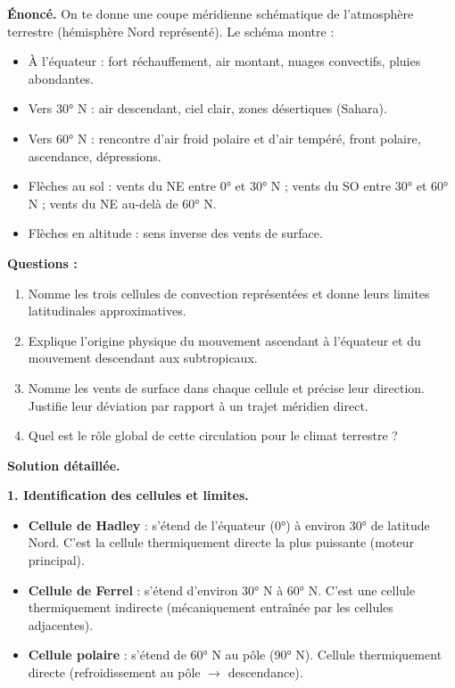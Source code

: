 \documentclass[11pt]{article}
\begin{document}
\begin{exoresolu}
\textbf{Énoncé.} On te donne une coupe méridienne schématique de l'atmosphère terrestre (hémisphère Nord représenté). Le schéma montre :
\begin{itemize}
    \item À l'équateur : fort réchauffement, air montant, nuages convectifs, pluies abondantes.
    \item Vers 30° N : air descendant, ciel clair, zones désertiques (Sahara).
    \item Vers 60° N : rencontre d'air froid polaire et d'air tempéré, front polaire, ascendance, dépressions.
    \item Flèches au sol : vents du NE entre 0° et 30° N ; vents du SO entre 30° et 60° N ; vents du NE au-delà de 60° N.
    \item Flèches en altitude : sens inverse des vents de surface.
\end{itemize}
\textbf{Questions :}
\begin{enumerate}
    \item Nomme les trois cellules de convection représentées et donne leurs limites latitudinales approximatives.
    \item Explique l'origine physique du mouvement ascendant à l'équateur et du mouvement descendant aux subtropicaux.
    \item Nomme les vents de surface dans chaque cellule et précise leur direction. Justifie leur déviation par rapport à un trajet méridien direct.
    \item Quel est le rôle global de cette circulation pour le climat terrestre ?
\end{enumerate}

\tcblower
\textbf{Solution détaillée.}

\textbf{1. Identification des cellules et limites.}
\begin{itemize}
    \item \textbf{Cellule de Hadley} : s'étend de l'équateur (0°) à environ 30° de latitude Nord. C'est la cellule thermiquement directe la plus puissante (moteur principal).
    \item \textbf{Cellule de Ferrel} : s'étend d'environ 30° N à 60° N. C'est une cellule thermiquement indirecte (mécaniquement entraînée par les cellules adjacentes).
    \item \textbf{Cellule polaire} : s'étend de 60° N au pôle (90° N). Cellule thermiquement directe (refroidissement au pôle $\to$ descendance).
\end{itemize}


\end{exoresolu}
\end{document}
